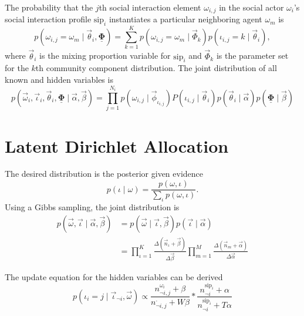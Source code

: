\documentclass[paper=a4, fontsize=11pt]{scrartcl}
\begin{document}
The probability that the $ j $th social interaction element $ \omega_{i,j} $ in the social actor $ \omega_{i} $'s social interaction profile $ \mbox{sip}_{i} $ instantiates a particular neighboring agent $ \omega_{m} $ is
\begin{equation}
p( \omega_{i,j} = \omega_{m} \mid \vec{\theta}_{i} , \underline{\mathbf{\Phi}} ) = \sum_{k=1}^{K} p( \omega_{i,j} = \omega_{m} \mid \vec{\Phi}_{k} ) p( \iota_{i,j} = k \mid \vec{\theta}_{i} ),
\end{equation}
where $ \vec{\theta}_{i} $ is the mixing proportion variable for $ \mbox{sip}_{i} $ and $ \vec{\Phi}_{k} $ is the parameter set for the $ k $th community component distribution.
The joint distribution of all known and hidden variables is
\begin{equation}
p( \vec{\omega}_{i} , \vec{\iota}_{i}, \vec{\theta}_{i} , \underline{\mathbf{\Phi}}  \mid \vec{\alpha} , \vec{\beta} ) = \prod_{j=1}^{N_{i}} 
p( \omega_{i,j} \mid \vec{\phi}_{\iota_{i,j}} ) P( \iota_{i,j} \mid \vec{\theta}_{i} )
p( \vec{\theta}_{i} \mid \vec{\alpha} ) p( \underline{\mathbf{\Phi}} \mid \vec{\beta} )
\end{equation}

\section{Latent Dirichlet Allocation}

The desired distribution is the posterior given evidence
\begin{equation}
p( \iota \mid \omega ) = \frac{ p( \omega , \iota ) }{ \sum_{ \iota } p( \omega , \iota ) }.
\end{equation}
Using a Gibbs sampling, the joint distribution is
\begin{equation}
\begin{aligned}
p( \vec{\omega}, \vec{\iota} \mid \vec{\alpha}, \vec{\beta} )  & = p( \vec{\omega} \mid \vec{\iota}, \vec{\beta} ) p( \vec{\iota} \mid \vec{\alpha} ) \\
& = \prod_{\iota = 1}^{K} \frac{\Delta(\vec{n}_{\iota}+\vec{\beta})}{\Delta{\vec{\beta}}}
\prod_{m=1}^{M} \frac{\Delta(\vec{n}_{m}+\vec{\alpha})}{\Delta{\vec{\alpha}}}
\end{aligned}
\end{equation}

The update equation for the hidden variables can be derived
\begin{equation}
p( \iota_{i} = j \mid \vec{\iota}_{\neg i}, \vec{\omega}) \propto 
\frac{ n^{\omega_{i}}_{\neg i, j}+\beta }{ n^{\cdot}_{\neg i, j}+W\beta } \ast \frac{ n^{\mbox{sip}_{i}}_{\neg i}+\alpha }{ n^{\mbox{sip}_{i}}_{\neg i}+T\alpha }
\end{equation}
\end{document}
